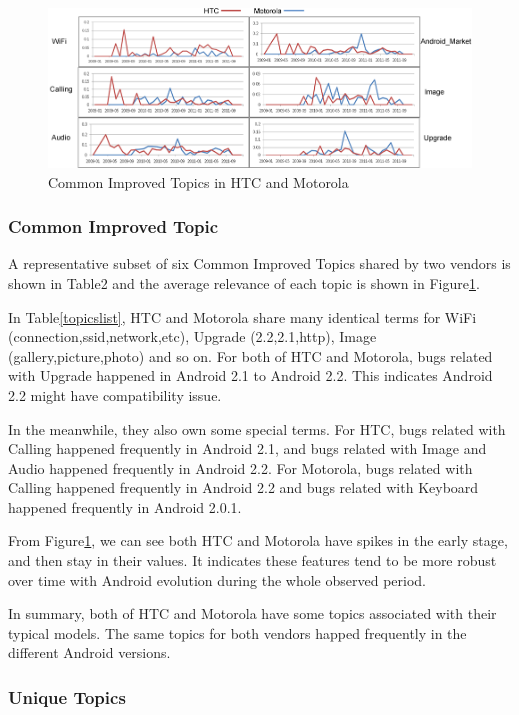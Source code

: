 \documentclass[10pt, conference, compsocconf]{IEEEtran}
\begin{document}
\begin{figure}[htb]
\centering
\includegraphics[width=1\textwidth]{fixtopic.png}
\caption{Common Improved Topics in HTC and Motorola}
\label{fixtopic}
\end{figure}

\subsubsection{Common Improved Topic}

A representative subset of six Common Improved Topics shared by two vendors is shown in Table2 and the average relevance of each topic is shown in Figure\ref{fixtopic}.

In Table\ref{topicslist}, HTC and Motorola share many identical terms for WiFi (connection,ssid,network,etc), Upgrade (2.2,2.1,http), Image (gallery,picture,photo) and so on. For both of HTC and Motorola, bugs related with Upgrade happened in Android 2.1 to Android 2.2. This indicates Android 2.2 might have compatibility issue. 

In the meanwhile, they also own some special terms. For HTC, bugs related with Calling happened frequently in Android 2.1, and bugs related with Image and Audio happened frequently in Android 2.2. For Motorola, bugs related with Calling happened frequently in Android 2.2 and bugs related with Keyboard happened frequently in Android 2.0.1.

From Figure\ref{fixtopic}, we can see both HTC and Motorola have spikes in the early stage, and then stay in their values. It indicates these features tend to be more robust over time with Android evolution during the whole observed period.

In summary, both of HTC and Motorola have some topics associated with their typical models. The same topics for both vendors happed frequently in the different Android versions.

\subsubsection{Unique Topics}
\end{document}
